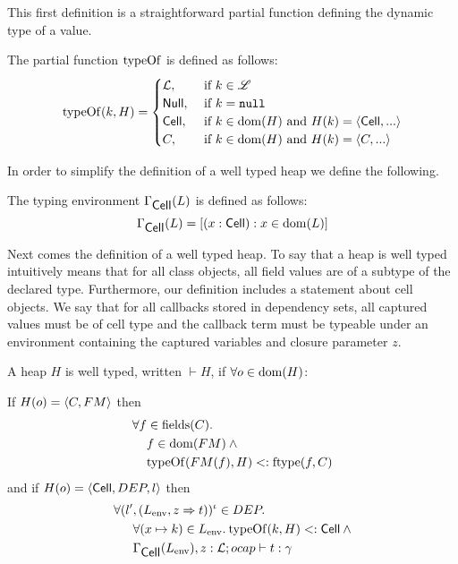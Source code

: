 This first definition is a straightforward partial function defining the dynamic
type of a value.
\begin{definition}
  The partial function $\mbox{$\mathrm{typeOf}$}$ is defined as follows:
  \begin{equation}
    \mbox{$\mathrm{typeOf}$}{(k, H)} =
    \begin{cases}
      \mbox{$\mathcal{L}$}, &\text{ if }k \in \mbox{$\mathscr{L}$} \\
      \mbox{$\mathsf{Null}$}, &\text{ if }k = \mbox{\mdseries\texttt{null}} \\
      \mbox{$\mathsf{Cell}$}, &\text{ if }k \in \mbox{$\mathrm{dom}$}{(H)}\text{ and } H(k) = \mbox{$\langle \mbox{$\mathsf{Cell}$}{}, ... \rangle$} \\
      C, &\text{ if }k \in \mbox{$\mathrm{dom}$}{(H)}\text{ and } H(k) = \mbox{$\langle C, ... \rangle$} \\
    \end{cases}
  \end{equation}
\end{definition}
In order to simplify the definition of a well typed heap we define the
following.
\begin{definition}
  The typing environment $\Gamma_{\mbox{$\mathsf{Cell}$}}(L)$ is defined as follows:
  \begin{equation}
    \Gamma_{\mbox{$\mathsf{Cell}$}}(L) = \left[(x: \mbox{$\mathsf{Cell}$}) : x \in \mbox{$\mathrm{dom}$}(L)\right]
  \end{equation}
\end{definition}
Next comes the definition of a well typed heap. To say that a heap is
well typed intuitively means that for all class objects, all field values are of
a subtype of the declared type. Furthermore, our definition includes a statement
about cell objects. We say that for all callbacks stored in dependency sets, all
captured values must be of cell type and the callback term must be typeable
under an environment containing the captured variables and closure parameter
$z$.
\begin{definition}
  A heap $H$ is well typed, written $\vdash{H}$, if
  $\forall o \in \mbox{$\mathrm{dom}$}{(H)}$:

  If $H(o) = \mbox{$\langle C, FM \rangle$}$ then
  \begin{equation} \label{eq:defwth1}
    \begin{aligned}
      \forall f &\in \mbox{$\mathrm{fields}$}{(C)}. \\ 
      &f \in \mbox{$\mathrm{dom}$}{(FM)} \: \land \\ 
      &\mbox{$\mathrm{typeOf}$}{(FM(f), H)} <: \mbox{$\mathrm{ftype}$}{(f, C)}
    \end{aligned}
  \end{equation}
  and if $H(o) = \mbox{$\langle \mbox{$\mathsf{Cell}$}{}, DEP, l \rangle$}$ then
  \begin{equation} \label{eq:defwth2}
    \begin{aligned}
      \forall (l'&, (L_{\text{env}}, z \Rightarrow t))^\iota \in DEP. \\
      &\forall (x \mapsto k) \in L_{\text{env}}.\: \mbox{$\mathrm{typeOf}$}{(k, H)} <:
      \mbox{$\mathsf{Cell}$} \: \land \\
      &\mbox{$\Gamma_{\mbox{$\mathsf{Cell}$}{}}(L_{\text{env}}), z:
      \mbox{$\mathcal{L}$};\mbox{$ocap$}\vdash t:\gamma$} 
    \end{aligned}
  \end{equation}
\end{definition}


